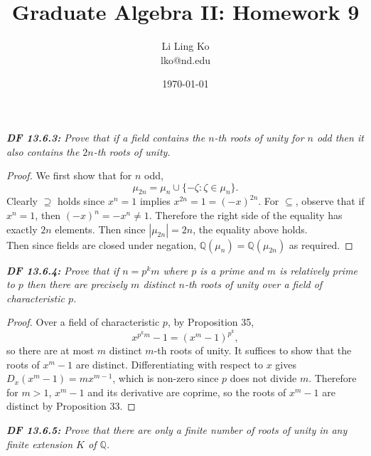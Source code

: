 \documentclass{article}
\begin{document}
\title{Graduate Algebra II: Homework 9}
\author{Li Ling Ko\\ lko@nd.edu}
\date{\today}
\maketitle

\it \textbf{DF 13.6.3:} Prove that if a field contains the $n$-th roots of
  unity for $n$ odd then it also contains the $2n$-th roots of unity.

  \begin{proof}
    We first show that for $n$ odd,
    \[\mu_{2n} =\mu_n \cup \{-\zeta:\zeta\in\mu_n\}.\]
    Clearly $\supseteq$ holds since $x^n=1$ implies $x^{2n}=1=(-x)^{2n}$.
    For $\subseteq$, observe that if $x^n=1$, then $(-x)^n=-x^n\neq1$.
    Therefore the right side of the equality has exactly $2n$ elements.
    Then since $|\mu_{2n}|=2n$, the equality above holds. \\

    Then since fields are closed under negation,
    $\mathbb{Q}(\mu_n)=\mathbb{Q}(\mu_{2n})$ as required.
  \end{proof}

\it \textbf{DF 13.6.4:} Prove that if $n=p^km$ where $p$ is a prime and $m$
  is relatively prime to $p$ then there are precisely $m$ distinct $n$-th
  roots of unity over a field of characteristic $p$.

  \begin{proof}
    Over a field of characteristic $p$, by Proposition 35,
    \[x^{p^km}-1 =(x^m-1)^{p^k},\]
    so there are at most $m$ distinct $m$-th roots of unity. It suffices to
    show that the roots of $x^m-1$ are distinct. Differentiating with
    respect to $x$ gives $D_x(x^m-1)=mx^{m-1}$, which is non-zero since $p$
    does not divide $m$. Therefore for $m>1$, $x^m-1$ and its derivative
    are coprime, so the roots of $x^m-1$ are distinct by Proposition 33.
  \end{proof}

\it \textbf{DF 13.6.5:} Prove that there are only a finite number of roots
  of unity in any finite extension $K$ of $\mathbb{Q}$.
\end{document}
